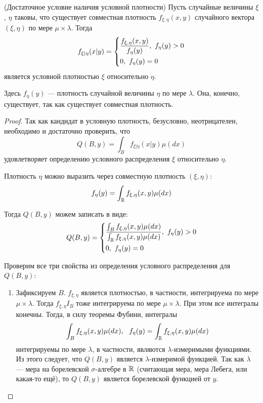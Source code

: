 \begin{theorem} (Достаточное условие наличия условной плотности)
    Пусть случайные величины $\xi$, $\eta$ таковы, что существует совместная плотность $f_{\xi, \eta}(x, y)$ случайного вектора $(\xi, \eta)$ по мере $\mu \times \lambda$. Тогда
    \[
        f_{\xi | \eta}(x | y) = \left\{\begin{aligned}
            & \frac{f_{\xi, \eta}(x, y)}{f_\eta(y)},\ f_\eta(y) > 0
            \\
            & 0,\ f_\eta(y) = 0
        \end{aligned}\right.
    \]
    является условной плотностью $\xi$ относительно $\eta$.

    Здесь $f_\eta(y)$ --- плотность случайной величины $\eta$ по мере $\lambda$. Она, конечно, существует, так как существует совместная плотность.
\end{theorem}

\begin{proof}
    Так как кандидат в условную плотность, безусловно, неотрицателен, необходимо и достаточно проверить, что
    \[
        Q(B, y) = \int_B f_{\xi | \eta}(x | y) \mu(dx)
    \]
    удовлетворяет определению условного распределения $\xi$ относительно $\eta$.

    Плотность $\eta$ можно выразить через совместную плотность $(\xi, \eta)$:
    \[
        f_\eta(y) = \int_{\mathbb{R}} f_{\xi, \eta}(x, y) \mu(dx)
    \]
    
    Тогда $Q(B, y)$ можем записать в виде:
    \[
        Q(B, y) = \left\{\begin{aligned}
            & \frac{\int_B f_{\xi, \eta}(x, y) \mu(dx)}{\int_{\mathbb{R}} f_{\xi, \eta}(x, y) \mu(dx)},\  f_\eta(y) > 0
            \\
            & 0,\ f_\eta(y) = 0
        \end{aligned}\right.
    \]

    Проверим все три свойства из определения условного распределения для $Q(B, y)$:
    \begin{enumerate}
        \item Зафиксируем $B$. $f_{\xi, \eta}$ является плотностью, в частности, интегрируема по мере $\mu \times \lambda$. Тогда $f_{\xi, \eta} I_B$ тоже интегрируема по мере $\mu \times \lambda$. При этом все интегралы конечны. Тогда, в силу теоремы Фубини, интегралы
        \[
            \int_B f_{\xi, \eta}(x, y) \mu(dx),\ \ f_\eta(y) = \int_\R f_{\xi, \eta}(x, y) \mu(dx)
        \]
        интегрируемы по мере $\lambda$, в частности, являются $\lambda$-измеримыми функциями. Из этого следует, что $Q(B, y)$ является $\lambda$-измеримой функцией. Так как $\lambda$ --- мера на борелевской $\sigma$-алгебре в $\mathbb{R}$ (считающая мера, мера Лебега, или какая-то ещё), то $Q(B, y)$ является борелевской функцией от $y$.


\end{enumerate}
\end{proof}
